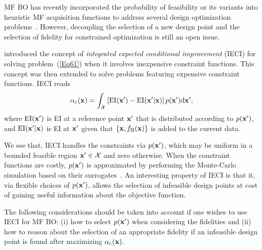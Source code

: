 \documentclass[iicol,sn-basic]{sn-jnl}%
\begin{document}
MF BO has recently incorporated the probability of feasibility or its variants into heuristic MF acquisition functions to address several design optimization problems~\citep[see e.g.,][]{Ghoreishi2019,Ruan2020,Ribeiro2023}.
However, decoupling the selection of a new design point and the selection of fidelity for constrained optimization is still an open issue.

\cite{Gramacy2011} introduced the concept of \textit{integrated expected conditional improvement} (IECI) for solving problem~(\ref{Eq61}) when it involves inexpensive constraint functions.
This concept was then extended to solve problems featuring expensive constraint functions.
IECI reads
\begin{equation}\label{Eq64}
	\alpha_\text{c}({\bf x}) = \int_{\mathcal{X}} \left[\text{EI}({\bf x'}) - \text{EI}({\bf x'}|{\bf x})\right] p({\bf x'}) \text{d}{\bf x'},
\end{equation}
where $\text{EI}({\bf x'})$ is EI at a reference point $\bf x'$ that is distributed according to $p({\bf x'})$, and $\text{EI}({\bf x'}|{\bf x})$ is EI at $\bf x'$ given that $\{{\bf x},f_\text{H}({\bf x})\}$ is added to the current data.

We see that, IECI handles the constraints via $p({\bf x'})$, which may be uniform in a bounded feasible region ${\bf x'} \in \mathcal{X}$ and zero otherwise.
When the constraint functions are costly, $p({\bf x'})$ is approximated by performing the Monte-Carlo simulation based on their surrogates~\citep{Gramacy2011}.
An interesting property of IECI is that it, via flexible choices of $p({\bf x'})$, allows the selection of infeasible design points at cost of gaining useful information about the objective function.

The following considerations should be taken into account if one wishes to use IECI for MF BO: (i) how to select $p({\bf x'})$ when considering the fidelities and (ii) how to reason about the selection of an appropriate fidelity if an infeasible design point is found after maximizing $\alpha_\text{c}({\bf x})$.  
\end{document}
